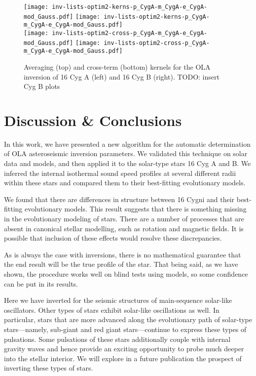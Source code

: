 \documentclass[twocolumn,twocolappendix]{aastex6}
\begin{document}
\begin{figure*}%
    \texttt{[image: inv-lists-optim2-kerns-p\_CygA-m\_CygA-e\_CygA-mod\_Gauss.pdf]}
    \texttt{[image: inv-lists-optim2-kerns-p\_CygA-m\_CygA-e\_CygA-mod\_Gauss.pdf]}\\
    \texttt{[image: inv-lists-optim2-cross-p\_CygA-m\_CygA-e\_CygA-mod\_Gauss.pdf]}%
    \texttt{[image: inv-lists-optim2-cross-p\_CygA-m\_CygA-e\_CygA-mod\_Gauss.pdf]}
    \caption{Averaging (top) and cross-term (bottom) kernels for the OLA inversion of 16 Cyg A (left) and 16 Cyg B (right). TODO: insert Cyg B plots }
    \label{fig:Cyg-kerns} 
\end{figure*}


\section{Discussion \& Conclusions} 
In this work, we have presented a new algorithm for the automatic determination of OLA asteroseismic inversion parameters. We validated this technique on solar data and models, and then applied it to the solar-type stars 16 Cyg A and B. We inferred the internal isothermal sound speed profiles at several different radii within these stars and compared them to their best-fitting evolutionary models. 

We found that there are differences in structure between 16 Cygni and their best-fitting evolutionary models. This result suggests that there is something missing in the evolutionary modeling of stars. There are a number of processes that are absent in canonical stellar modelling, such as rotation and magnetic fields. It is possible that inclusion of these effects would resolve these discrepancies. 

As is always the case with inversions, there is no mathematical guarantee that the end result will be the true profile of the star. That being said, as we have shown, the procedure works well on blind tests using models, so some confidence can be put in its results. 

Here we have inverted for the seismic structures of main-sequence solar-like oscillators. Other types of stars exhibit solar-like oscillations as well. In particular, stars that are more advanced along the evolutionary path of solar-type stars---namely, sub-giant and red giant stars---continue to express these types of pulsations. Some pulsations of these stars additionally couple with internal gravity waves and hence provide an exciting opportunity to probe much deeper into the stellar interior. We will explore in a future publication the prospect of inverting these types of stars. 
\end{document}
